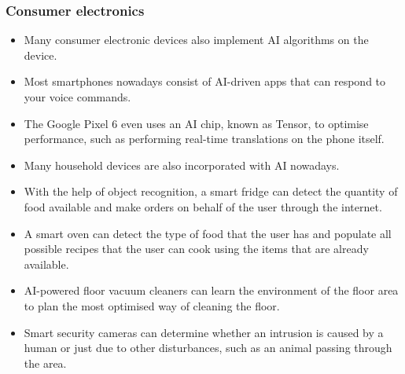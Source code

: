 \documentclass[11pt]{article}
\begin{document}
\subsubsection{Consumer electronics}
\label{sec:org3459c72}
\begin{itemize}
\item Many consumer electronic devices also implement AI algorithms on the device.
\item Most smartphones nowadays consist of AI-driven apps that can respond to your voice commands.
\item The Google Pixel 6 even uses an AI chip, known as Tensor, to optimise performance, such as performing real-time translations on the phone itself.
\item Many household devices are also incorporated with AI nowadays.
\item With the help of object recognition, a smart fridge can detect the quantity of food available and make orders on behalf of the user through the internet.
\item A smart oven can detect the type of food that the user has and populate all possible recipes that the user can cook using the items that are already available.
\item AI-powered floor vacuum cleaners can learn the environment of the floor area to plan the most optimised way of cleaning the floor.
\item Smart security cameras can determine whether an intrusion is caused by a human or just due to other disturbances, such as an animal passing through the area.
\end{itemize}

 \newpage
\end{document}
